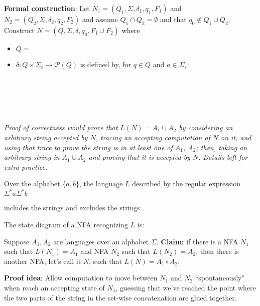 \documentclass[12pt, oneside]{article}
\begin{document}
{\bf Formal construction}: Let 
$N_1 = (Q_1, \Sigma, \delta_1, q_1, F_1)$ and $N_2 = (Q_2, \Sigma, \delta_2,q_2, F_2)$
and assume $Q_1 \cap Q_2 = \emptyset$ and that $q_0 \notin Q_1 \cup Q_2$.
Construct $N = (Q, \Sigma, \delta, q_0, F_1 \cup F_2)$ where
\begin{itemize}
    \item $Q = $
    \item $\delta: Q \times \Sigma_\varepsilon \to \mathcal{P}(Q)$ is defined by, for $q \in Q$ and $a \in \Sigma_{\varepsilon}$:
        \[
            \phantom{\delta((q,a))=\begin{cases}  \delta_1 ((q,a)) &\qquad\text{if } q\in Q_1 \\ \delta_2 ((q,a)) &\qquad\text{if } q\in Q_2 \\ \{q1,q2\} &\qquad\text{if } q = q_0, a = \varepsilon \\ \emptyset\text{if } q= q_0, a \neq \varepsilon \end{cases}}
        \]
\end{itemize}


\vfill
{\it Proof of correctness would prove that $L(N) = A_1 \cup A_2$ by considering
an arbitrary string accepted by $N$, tracing an accepting computation of $N$ on it, and using 
that trace to prove the string is in at least one of $A_1$, $A_2$; then, taking an arbitrary 
string in $A_1 \cup A_2$ and proving that it is accepted by $N$. Details left for extra practice.}

\newpage
Over the alphabet $\{a,b\}$, the language $L$ described by the regular expression 
$\Sigma^* a \Sigma^* b$

 includes the strings \phantom{space for strings here} and excludes the strings 


The state diagram of a NFA recognizing $L$ is:

\vspace{100pt}

Suppose $A_1, A_2$ are languages over an alphabet $\Sigma$.
{\bf Claim:} if there is a NFA $N_1$ such that $L(N_1) = A_1$ and 
NFA $N_2$ such that $L(N_2) = A_2$, then there is another NFA, let's call it $N$, such that 
$L(N) = A_1 \circ A_2$.

{\bf Proof idea}: Allow computation to move between $N_1$ and $N_2$ ``spontaneously" when reach an accepting state of 
$N_1$, guessing that we've reached the point where the two parts of the string in the set-wise concatenation 
are glued together.
\end{document}
